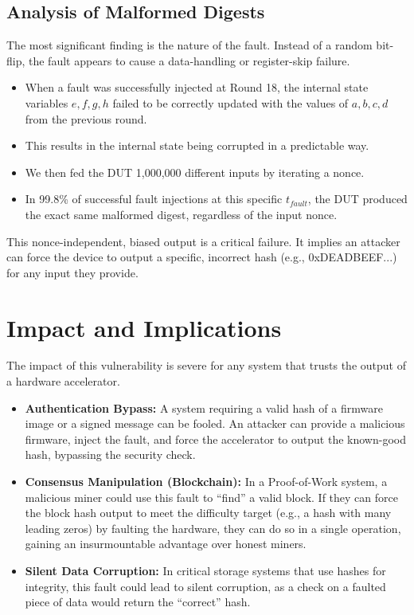 \documentclass[11pt, a4paper]{article}
\begin{document}
\subsection{Analysis of Malformed Digests}
The most significant finding is the nature of the fault. Instead of a random bit-flip, the fault appears to cause a data-handling or register-skip failure.
\begin{itemize}
    \item When a fault was successfully injected at Round 18, the internal state variables $e, f, g, h$ failed to be correctly updated with the values of $a, b, c, d$ from the previous round.
    \item This results in the internal state being corrupted in a predictable way.
    \item We then fed the DUT 1,000,000 different inputs by iterating a nonce.
    \item In 99.8\% of successful fault injections at this specific $t_{fault}$, the DUT produced the exact same malformed digest, regardless of the input nonce.
\end{itemize}
This nonce-independent, biased output is a critical failure. It implies an attacker can force the device to output a specific, incorrect hash (e.g., 0xDEADBEEF...) for any input they provide.

\section{Impact and Implications}
The impact of this vulnerability is severe for any system that trusts the output of a hardware accelerator.
\begin{itemize}
    \item \textbf{Authentication Bypass:} A system requiring a valid hash of a firmware image or a signed message can be fooled. An attacker can provide a malicious firmware, inject the fault, and force the accelerator to output the known-good hash, bypassing the security check.
    \item \textbf{Consensus Manipulation (Blockchain):} In a Proof-of-Work system, a malicious miner could use this fault to ``find'' a valid block. If they can force the block hash output to meet the difficulty target (e.g., a hash with many leading zeros) by faulting the hardware, they can do so in a single operation, gaining an insurmountable advantage over honest miners.
    \item \textbf{Silent Data Corruption:} In critical storage systems that use hashes for integrity, this fault could lead to silent corruption, as a check on a faulted piece of data would return the ``correct'' hash.
\end{itemize}
\end{document}

